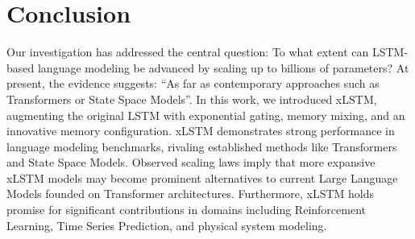 \section{Conclusion}
Our investigation has addressed the central question: To what extent can LSTM-based language modeling be advanced by scaling up to billions of parameters? At present, the evidence suggests: ``As far as contemporary approaches such as Transformers or State Space Models''. In this work, we introduced xLSTM, augmenting the original LSTM with exponential gating, memory mixing, and an innovative memory configuration. xLSTM demonstrates strong performance in language modeling benchmarks, rivaling established methods like Transformers and State Space Models. Observed scaling laws imply that more expansive xLSTM models may become prominent alternatives to current Large Language Models founded on Transformer architectures. Furthermore, xLSTM holds promise for significant contributions in domains including Reinforcement Learning, Time Series Prediction, and physical system modeling.


